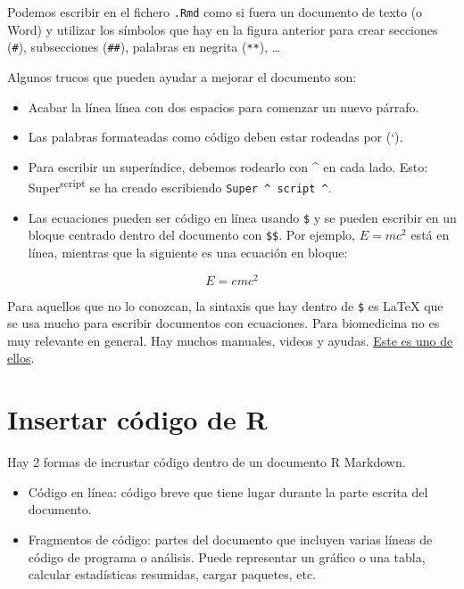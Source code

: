 \documentclass[
]{book}
\providecommand{\tightlist}{%
  \setlength{\itemsep}{0pt}\setlength{\parskip}{0pt}}
\begin{document}
Podemos escribir en el fichero \texttt{.Rmd} como si fuera un documento de texto (o Word) y utilizar los símbolos que hay en la figura anterior para crear secciones (\texttt{\#}), subsecciones (\texttt{\#\#}), palabras en negrita (\texttt{**}), \ldots{}

Algunos trucos que pueden ayudar a mejorar el documento son:

\begin{itemize}
\tightlist
\item
  Acabar la línea línea con dos espacios para comenzar un nuevo párrafo.
\item
  Las palabras formateadas como código deben estar rodeadas por (`).
\item
  Para escribir un superíndice, debemos rodearlo con \^{} en cada lado. Esto: Super\textsuperscript{script} se ha creado escribiendo \texttt{Super\ \^{}\ script\ \^{}}.
\item
  Las ecuaciones pueden ser código en línea usando \texttt{\$} y se pueden escribir en un bloque centrado dentro del documento con \texttt{\$\$}. Por ejemplo, \(E = mc^2\) está en línea, mientras que la siguiente es una ecuación en bloque:
\end{itemize}

\[E=emc^2\]

Para aquellos que no lo conozcan, la sintaxis que hay dentro de \texttt{\$} es LaTeX que se usa mucho para escribir documentos con ecuaciones. Para biomedicina no es muy relevante en general. Hay muchos manuales, videos y ayudas. \href{http://nokyotsu.com/latex/curso.html}{Este es uno de ellos}.

\hypertarget{insertar-cuxf3digo-de-r}{%
\section{Insertar código de R}\label{insertar-cuxf3digo-de-r}}

Hay 2 formas de incrustar código dentro de un documento R Markdown.

\begin{itemize}
\item
  Código en línea: código breve que tiene lugar durante la parte escrita del documento.
\item
  Fragmentos de código: partes del documento que incluyen varias líneas de código de programa o análisis. Puede representar un gráfico o una tabla, calcular estadísticas resumidas, cargar paquetes, etc.
\end{itemize}
\end{document}
